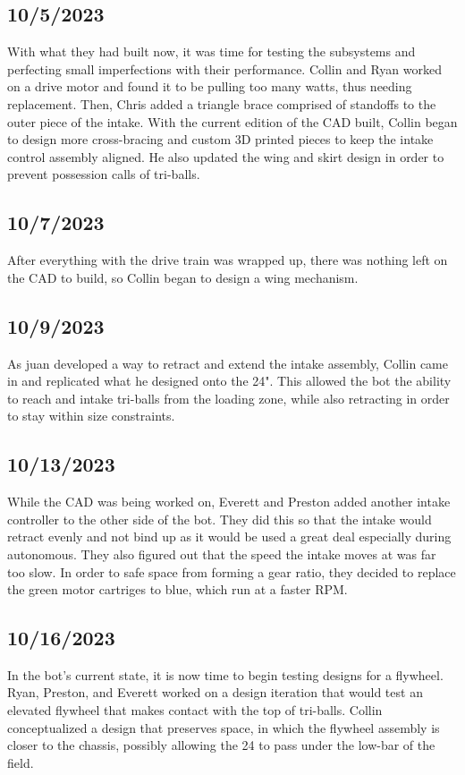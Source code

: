 \subsection{10/5/2023}
With what they had built now, it was time for testing the subsystems and perfecting small imperfections with their performance. Collin and Ryan worked on a drive motor and found it to be pulling too many watts, thus needing replacement. Then, Chris added a triangle brace comprised of standoffs to the outer piece of the intake. With the current edition of the CAD built, Collin began to design more cross-bracing and custom 3D printed pieces to keep the
intake control assembly aligned. He also updated the wing and skirt design in order to prevent possession calls of tri-balls.
\subsection{10/7/2023}
After everything with the drive train was wrapped up, there was nothing left on the CAD to build, so Collin began
to design a wing mechanism.
\subsection{10/9/2023}
As juan developed a way to retract and extend the intake assembly, Collin came in and replicated what he designed onto the 24".
This allowed the bot the ability to reach and intake tri-balls from the loading zone, while also retracting in order to stay within size constraints.
\subsection{10/13/2023}
While the CAD was being worked on, Everett and Preston added another intake controller to the other side of the bot.
They did this so that the intake would retract evenly and not bind up as it would be used a great deal especially during autonomous. They also figured out that the speed the intake
moves at was far too slow. In order to safe space from forming a gear ratio, they decided to replace the green motor cartriges to blue, which run at a faster RPM.

\subsection{10/16/2023}
In the bot's current state, it is now time to begin testing designs for a flywheel. Ryan, Preston, and Everett worked on a design iteration that would test an elevated flywheel that makes contact with the top of tri-balls. Collin conceptualized a design that preserves space, in which the flywheel assembly is closer to the chassis, possibly allowing the 24
to pass under the low-bar of the field.
